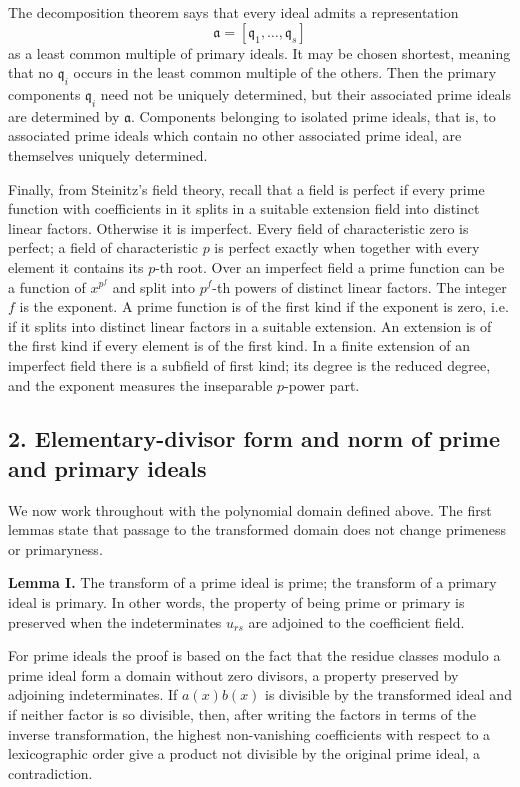 \documentclass[11pt]{article}
\begin{document}
The decomposition theorem says that every ideal admits a representation
\[
  \mathfrak a=[\mathfrak q_1,\ldots,\mathfrak q_s]
\]
as a least common multiple of primary ideals. It may be chosen shortest, meaning that no $\mathfrak q_i$ occurs in the least common multiple of the others. Then the primary components $\mathfrak q_i$ need not be uniquely determined, but their associated prime ideals are determined by $\mathfrak a$. Components belonging to isolated prime ideals, that is, to associated prime ideals which contain no other associated prime ideal, are themselves uniquely determined.

Finally, from Steinitz's field theory, recall that a field is perfect if every prime function with coefficients in it splits in a suitable extension field into distinct linear factors. Otherwise it is imperfect. Every field of characteristic zero is perfect; a field of characteristic $p$ is perfect exactly when together with every element it contains its $p$-th root. Over an imperfect field a prime function can be a function of $x^{p^f}$ and split into $p^f$-th powers of distinct linear factors. The integer $f$ is the exponent. A prime function is of the first kind if the exponent is zero, i.e. if it splits into distinct linear factors in a suitable extension. An extension is of the first kind if every element is of the first kind. In a finite extension of an imperfect field there is a subfield of first kind; its degree is the reduced degree, and the exponent measures the inseparable $p$-power part.

\subsection{2. Elementary-divisor form and norm of prime and primary ideals}

We now work throughout with the polynomial domain defined above. The first lemmas state that passage to the transformed domain does not change primeness or primaryness.

\textbf{Lemma I.} The transform of a prime ideal is prime; the transform of a primary ideal is primary. In other words, the property of being prime or primary is preserved when the indeterminates $u_{rs}$ are adjoined to the coefficient field.

For prime ideals the proof is based on the fact that the residue classes modulo a prime ideal form a domain without zero divisors, a property preserved by adjoining indeterminates. If $a(x)b(x)$ is divisible by the transformed ideal and if neither factor is so divisible, then, after writing the factors in terms of the inverse transformation, the highest non-vanishing coefficients with respect to a lexicographic order give a product not divisible by the original prime ideal, a contradiction.
\end{document}
